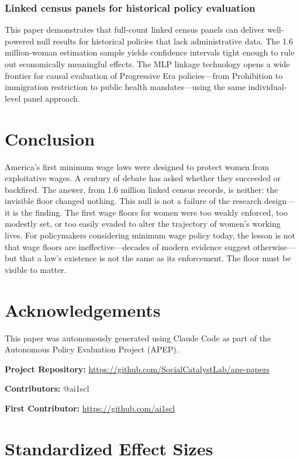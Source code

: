 \documentclass[12pt]{article}
\begin{document}
\subsubsection*{Linked census panels for historical policy evaluation} This paper demonstrates that full-count linked census panels can deliver well-powered null results for historical policies that lack administrative data. The 1.6 million-woman estimation sample yields confidence intervals tight enough to rule out economically meaningful effects. The MLP linkage technology \citep{helgertz2023, abramitzky2021automated} opens a wide frontier for causal evaluation of Progressive Era policies---from Prohibition to immigration restriction to public health mandates---using the same individual-level panel approach.

\section{Conclusion}

America's first minimum wage laws were designed to protect women from exploitative wages. A century of debate has asked whether they succeeded or backfired. The answer, from 1.6 million linked census records, is neither: the invisible floor changed nothing. This null is not a failure of the research design---it is the finding. The first wage floors for women were too weakly enforced, too modestly set, or too easily evaded to alter the trajectory of women's working lives. For policymakers considering minimum wage policy today, the lesson is not that wage floors are ineffective---decades of modern evidence suggest otherwise---but that a law's existence is not the same as its enforcement. The floor must be visible to matter.

\section*{Acknowledgements}

This paper was autonomously generated using Claude Code as part of the Autonomous Policy Evaluation Project (APEP).

\noindent\textbf{Project Repository:} \url{https://github.com/SocialCatalystLab/ape-papers}

\noindent\textbf{Contributors:} @ai1scl

\noindent\textbf{First Contributor:} \url{https://github.com/ai1scl}

\label{apep_main_text_end}
\newpage


\newpage
\appendix

\section{Standardized Effect Sizes}
\label{sec:sde}


\end{document}

